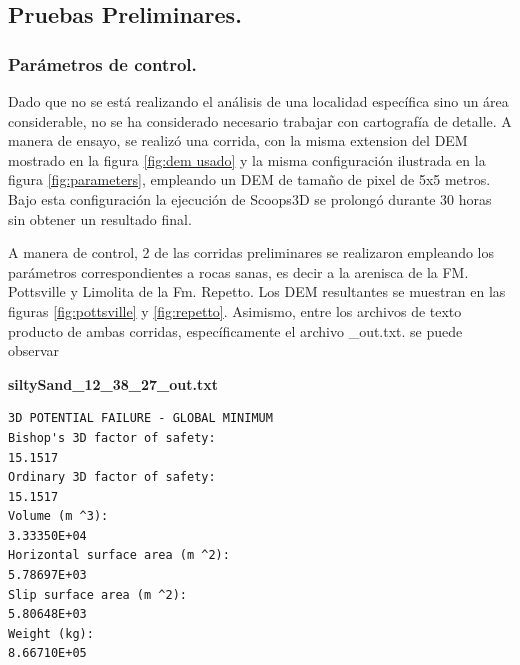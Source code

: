 \subsection{Pruebas Preliminares.}
\label{chap:pruebas preliminares}
\subsubsection{Par\'ametros de control.}

Dado que no se est\'a realizando el an\'alisis de una localidad espec\'ifica sino un \'area considerable, no se ha considerado necesario trabajar con cartograf\'ia de detalle. A manera de ensayo, se realiz\'o una corrida, con la misma extension del DEM mostrado en la figura \ref{fig:dem usado} y la misma configuraci\'on ilustrada en la figura \ref{fig:parameters}, empleando un DEM de tama\~no de pixel de 5x5 metros.
Bajo esta configuraci\'on la ejecuci\'on de Scoops3D se prolong\'o durante 30 horas sin obtener un resultado final.


A manera de control, 2 de las corridas preliminares se realizaron empleando los par\'ametros correspondientes a rocas sanas, es decir a la arenisca de la FM. Pottsville y Limolita de la Fm. Repetto. Los DEM resultantes se muestran en las figuras \ref{fig:pottsville} y \ref{fig:repetto}.
Asimismo, entre los archivos de texto producto de ambas corridas, espec\'ificamente el archivo \_out.txt. se puede observar\linebreak


\pagebreak
\begin{center}
\textbf{siltySand\_12\_38\_27\_out.txt}

\begin{verbatim}
3D POTENTIAL FAILURE - GLOBAL MINIMUM
Bishop's 3D factor of safety:                                          15.1517
Ordinary 3D factor of safety:                                          15.1517
Volume (m ^3):                                                     3.33350E+04
Horizontal surface area (m ^2):                                    5.78697E+03
Slip surface area (m ^2):                                          5.80648E+03
Weight (kg):                                                       8.66710E+05
\end{verbatim}
\end{center}

